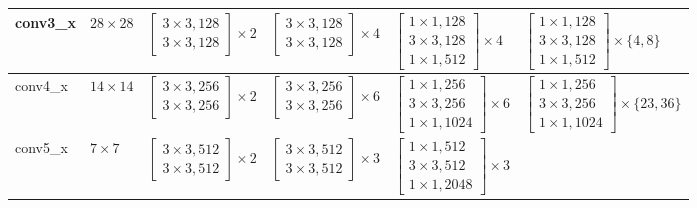 \begin{table}[t]
\begin{tabular}{l l l l l l}
\midrule
conv3\_x & $28\times28$
  & $\left[\begin{smallmatrix}3\times3,128\\3\times3,128\end{smallmatrix}\right]\!\times2$
  & $\left[\begin{smallmatrix}3\times3,128\\3\times3,128\end{smallmatrix}\right]\!\times4$
  & $\left[\begin{smallmatrix}1\times1,128\\3\times3,128\\1\times1,512\end{smallmatrix}\right]\!\times4$
  & $\left[\begin{smallmatrix}1\times1,128\\3\times3,128\\1\times1,512\end{smallmatrix}\right]\!\times\{4,8\}$ \\
\midrule
conv4\_x & $14\times14$
  & $\left[\begin{smallmatrix}3\times3,256\\3\times3,256\end{smallmatrix}\right]\!\times2$
  & $\left[\begin{smallmatrix}3\times3,256\\3\times3,256\end{smallmatrix}\right]\!\times6$
  & $\left[\begin{smallmatrix}1\times1,256\\3\times3,256\\1\times1,1024\end{smallmatrix}\right]\!\times6$
  & $\left[\begin{smallmatrix}1\times1,256\\3\times3,256\\1\times1,1024\end{smallmatrix}\right]\!\times\{23,36\}$ \\
\midrule
conv5\_x & $7\times7$
  & $\left[\begin{smallmatrix}3\times3,512\\3\times3,512\end{smallmatrix}\right]\!\times2$
  & $\left[\begin{smallmatrix}3\times3,512\\3\times3,512\end{smallmatrix}\right]\!\times3$
  & $\left[\begin{smallmatrix}1\times1,512\\3\times3,512\\1\times1,2048\end{smallmatrix}\right]\!\times3$

\end{tabular}
\end{table}
